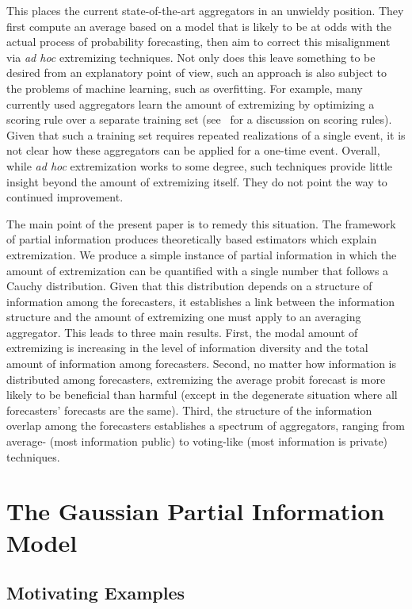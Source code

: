 \documentclass[11pt]{article}
\theoremstyle{definition}
\theoremstyle{definition}
\begin{document}
This places the current state-of-the-art aggregators in an unwieldy
position.  They first compute an average based on a model that
is likely to be at odds with the actual process of probability
forecasting, then aim to correct this misalignment via {\em ad hoc} 
extremizing techniques.  
%
Not only does this leave something to be desired from an explanatory 
point of view, such an approach is also subject to the problems of 
machine learning, such as overfitting.  For example, many currently
used aggregators learn the amount of extremizing by optimizing a scoring
rule over a separate training set (see~\citealt{Gneiting04strictlyproper} 
for a discussion on scoring rules).
Given that such a training set requires repeated realizations of
a single event, it is not clear how these aggregators can be applied
for a one-time event. Overall, while {\em ad hoc} extremization works to some degree, such
techniques provide little insight beyond the amount of extremizing
itself.  They do not point the way to continued improvement.

The main point of the present paper is to remedy this situation.
The framework of partial information produces theoretically
based estimators which explain extremization.  We produce a 
simple instance of partial information in which the amount of 
extremization can be quantified with a single number
that follows a Cauchy distribution.  Given that this distribution
depends on a structure of information among the forecasters, it establishes
a link between the information structure and the amount of
extremizing one must apply to an averaging aggregator.  This leads
to three main results.  First, the modal amount of extremizing is 
increasing in the level of information diversity and the total amount 
of information among forecasters.  Second, no matter how information is 
distributed among forecasters, extremizing the average probit forecast
is more likely to be beneficial than harmful (except in the degenerate
situation where all forecasters' forecasts are the same). Third, the structure of the information overlap among the forecasters establishes a spectrum of aggregators, ranging from average- (most information public) to voting-like (most information is private) techniques. 


\section{The Gaussian Partial Information Model}
\label{sec:model}

\subsection{Motivating Examples}
\end{document}
